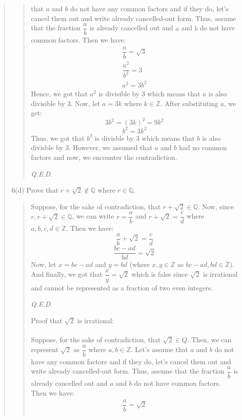 \documentclass[12pt, a4paper]{article}                      %
\begin{document}
\begin{enumerate}
\begin{quote}
\begin{quote}
that $a$ and $b$ do not have any common factors and if they do,
let's cancel them out and write already cancelled-out form. Thus, assume that
the fraction $\dfrac{a}{b}$ is already cancelled out and $a$ and $b$ do not have
common factors. Then we have:
\begin{align*}
\dfrac{a}{b} = \sqrt{3}\\
\dfrac{a^2}{b^2} = 3\\
a^2 = 3b^2
\end{align*}
Hence, we got that $a^2$ is divisible by 3 which means that $a$ is also divisible by 3.
Now, let $a = 3k$ where $k \in \mathbb{Z}$. After substituting $a$, we get:
$$3b^2 = (3k)^2 = 9k^2$$
$$b^2 = 3k^2$$
Thus, we got that $b^2$ is divisble by 3 which means that $b$ is also divisble by 3.
However, we assumed that $a$ and $b$ had no common factors and now, we encounter the
contradiction.
\begin{flushright}
\textit{Q.E.D.}
\end{flushright}
\end{quote}
\item[6(d)]
Prove that $r + \sqrt{2} \notin \mathbb{Q}$ where $r \in \mathbb{Q}$.
\begin{quote}
Suppose, for the sake of contradiction, that $r + \sqrt{2} \in \mathbb{Q}$.
Now, since $r, r + \sqrt{2} \in \mathbb{Q}$, we can write $r = \dfrac{a}{b}$ and $r + \sqrt{2} = \dfrac{c}{d}$
where $a,b,c,d \in \mathbb{Z}$. Then we have:
$$\dfrac{a}{b} + \sqrt{2} = \dfrac{c}{d}$$
$$\dfrac{bc - ad}{bd} = \sqrt{2}$$
Now, let $x = bc - ad$ and $y = bd$ (where $x,y \in \mathbb{Z}$ as $bc - ad, bd \in \mathbb{Z}$).
And finally, we got that $\dfrac{x}{y} = \sqrt{2}$ which is false since $\sqrt{2}$ is irrational
and cannot be represented as a fraction of two even integers.
\begin{flushright}
\textit{Q.E.D.}
\end{flushright}
Proof that $\sqrt{2}$ is irrational:\\\\
Suppose, for the sake of contradiction, that $\sqrt{2} \in Q$. Then, we can
represent $\sqrt{2}$ as $\dfrac{a}{b}$ where $a,b \in \mathbb{Z}$. Let's assume
that $a$ and $b$ do not have any common factors and if they do,
let's cancel them out and write already cancelled-out form. Thus, assume that
the fraction $\dfrac{a}{b}$ is already cancelled out and $a$ and $b$ do not have
common factors. Then we have:
\begin{align*}
\dfrac{a}{b} = \sqrt{2}\\

\end{align*}
\end{quote}
\end{quote}
\end{enumerate}
\end{document}
